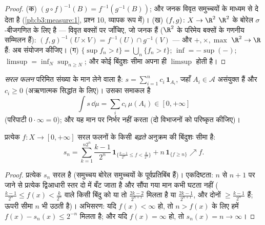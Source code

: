 \begin{proof}
(क) $(g\circ f)^{-1}(B) = f^{-1}(g^{-1}(B))$; और  जनक विवृत समुच्चयों के माध्यम से  दे
देता है (\cref{pb:b3:measure:1}, प्रश्न 10, व्यापक रूप में)।
(ख) $(f, g) \colon X \to \R^2$ $\R^2$ के बोरेल $\sigma$-बीजगणित के लिए  है --- विवृत
बक्सों पर जाँचिए, जो जनक हैं ($\R^2$ के  परिमेय बक्सों
के गणनीय सम्मिलन हैं): $(f,g)^{-1}(U\times V) = f^{-1}(U)\cap g^{-1}(V)$ --- और $+, \times, \max$  $\R^2 \to \R$ हैं: अब संयोजन
कीजिए।
(ग) $\{\sup f_n > t\} = \bigcup_n\{f_n > t\}$; $\inf = -\sup(-)$; $\limsup = \inf_N\sup_{n \geq N}$; और कोई बिंदुशः सीमा अपना ही $\limsup$ होती है।
\end{proof}

\begin{definition}\label{def:b3:lebesgue:simple}
\emph{सरल फलन} परिमित संख्या के मान लेने वाला
 है: $s = \sum_{i=1}^n
c_i\,\mathbf 1_{A_i}$, जहाँ $A_i \in \mathcal A$ असंयुक्त हैं और $c_i \geq
0$ (अऋणात्मक
सिद्धांत के लिए)। उसका समाकल है
\[
\int s\,\dd\mu = \sum_i c_i\,\mu(A_i) \in [0, +\infty]
\]
(परिपाटी $0\cdot\infty = 0$); और यह मान  पर निर्भर नहीं करता (दो
विभाजनों को परिष्कृत कीजिए)।
\end{definition}

\begin{theorem}
\label{thm:b3:lebesgue:approximation}
प्रत्येक  $f \colon X \to [0, +\infty]$ सरल फलनों के किसी \emph{बढ़ते} अनुक्रम की
बिंदुशः सीमा है:
\[
s_n = \sum_{k=1}^{n2^n} \frac{k-1}{2^n}\,
\mathbf 1_{\{\frac{k-1}{2^n} \leq f < \frac k{2^n}\}}
+ n\,\mathbf 1_{\{f \geq n\}} \nearrow f .
\]
\end{theorem}

\begin{proof}
प्रत्येक $s_n$ सरल है (समुच्चय बोरेल समुच्चयों के पूर्वप्रतिबिंब
हैं)। एकदिष्टता: $n$ से $n+1$ पर जाने से प्रत्येक द्विआधारी स्तर
दो में बँट जाता है और सौंपा गया मान कभी घटता नहीं ($\frac{k-1}{2^n} \leq f(x) < \frac k{2^n}$ वाले किसी
बिंदु को या तो $\frac{2k-2}{2^{n+1}}$ मिलता है या $\frac{2k-1}{2^{n+1}}$, और दोनों $\geq
\frac{k-1}{2^n}$ हैं; ऊपरी
सीमा $n$ भी उठती है)। अभिसरण: यदि $f(x) < \infty$ हो, तो $n > f(x)$ के लिए हमें
$f(x) - s_n(x) \leq
2^{-n}$ मिलता है; और यदि $f(x) = \infty$ हो, तो $s_n(x) = n \to \infty$।
\end{proof}

